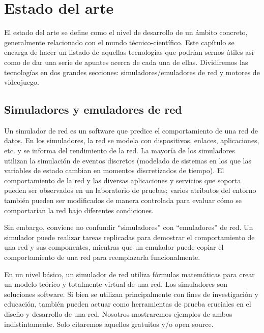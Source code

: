 \chapter{Estado del arte}\label{chap:ArtState}

El estado del arte se define como el nivel de desarrollo de un ámbito concreto, generalmente relacionado con el mundo técnico-científico. Este capítulo se encarga de hacer un listado de aquellas tecnologías que podrían sernos útiles así como de dar una serie de apuntes acerca de cada una de ellas. Dividiremos las tecnologías en dos grandes secciones: simuladores/emuladores de red y motores de videojuego.

\section{Simuladores y emuladores de red}
Un simulador de red es un software que predice el comportamiento de una red de datos. En los simuladores, la red se modela con dispositivos, enlaces, aplicaciones, etc. y se informa del rendimiento de la red. La mayoría de los simuladores utilizan la simulación de eventos discretos (modelado de sistemas en los que las variables de estado cambian en momentos discretizados de tiempo). El comportamiento de la red y las diversas aplicaciones y servicios que soporta pueden ser observados en un laboratorio de pruebas; varios atributos del entorno también pueden ser modificados de manera controlada para evaluar cómo se comportarían la red bajo diferentes condiciones\cite{wiki:Network_simulation}.

Sin embargo, conviene no confundir ``simuladores'' con ``emuladores'' de red. Un simulador puede realizar tareas replicadas para demostrar el comportamiento de una red y sus componentes, mientras que un emulador puede copiar el comportamiento de una red para reemplazarla funcionalmente\cite{emsim}.

En un nivel básico, un simulador de red utiliza fórmulas matemáticas para crear un modelo teórico y totalmente virtual de una red. Los simuladores son soluciones software. Si bien se utilizan principalmente con fines de investigación y educación, también pueden actuar como herramientas de prueba cruciales en el diseño y desarrollo de una red. Nosotros mostraremos ejemplos de ambos indistintamente. Solo citaremos aquellos gratuitos y/o open source.

